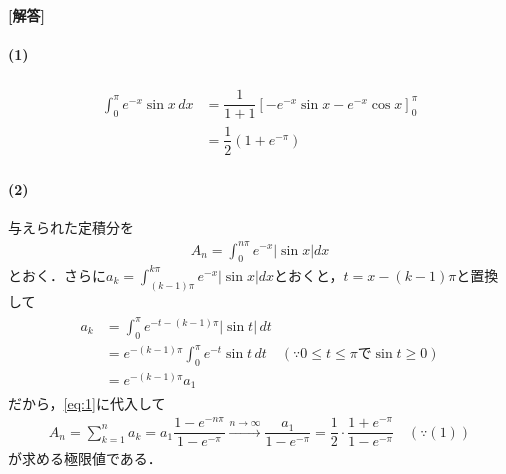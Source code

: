 \documentclass[../../main.tex]{subfiles}
\begin{document}
\begin{oframed}
  
\end{oframed}

{\bf [解答]}
\paragraph{(1)}

\begin{align}
  \begin{split}
    \int_0^\pi e^{-x}\sin x\,dx&=\dfrac{1}{1+1}\left[-e^{-x}\sin x-e^{-x}\cos x\right]_0^\pi \\
    &=\dfrac{1}{2}\left(1+e^{-\pi}\right)
  \end{split}
\end{align}

\paragraph{(2)}
与えられた定積分を
\begin{align}
  A_n=\displaystyle\int_0^{n\pi}e^{-x}|\sin x|dx \label{eq:1}
\end{align}
とおく．さらに$a_k=\displaystyle\int_{(k-1)\pi}^{k\pi}e^{-x}|\sin x|dx$とおくと，$t=x-(k-1)\pi$と置換して
\begin{align}
  \begin{split}
    a_k
    &=\int_0^\pi e^{-t-(k-1)\pi}|\sin t|\,dt \\
    &=e^{-(k-1)\pi}\int_0^\pi e^{-t}\sin t\,dt \quad(\because0\le t\le\pi\text{で}\sin t\ge0) \\
    &=e^{-(k-1)\pi}a_1
  \end{split}
\end{align}
だから，\cref{eq:1}に代入して
\begin{align}
  A_n=\sum_{k=1}^na_k=a_1\dfrac{1-e^{-n\pi}}{1-e^{-\pi}}\xrightarrow{n\to\infty}\dfrac{a_1}{1-e^{-\pi}}=\dfrac{1}{2}\cdot\dfrac{1+e^{-\pi}}{1-e^{-\pi}} \quad(\because(1))
\end{align}
が求める極限値である．

\newpage
\end{document}
